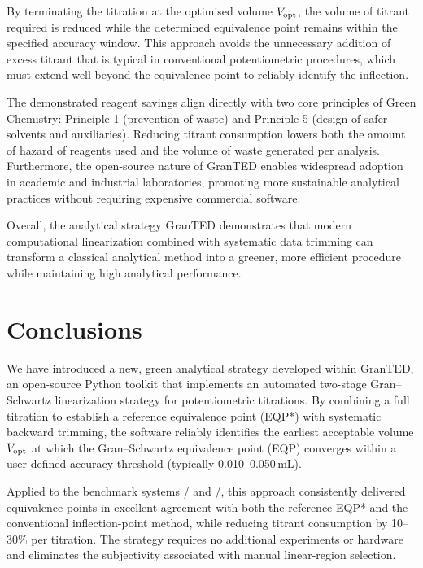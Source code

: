 \documentclass[twoside,twocolumn,9pt]{article}
\begin{document}
By terminating the titration at the optimised volume \(V_{\rm opt}\), the volume of titrant required is reduced while the determined equivalence point remains within the specified accuracy window.
This approach avoids the unnecessary addition of excess titrant that is typical in conventional potentiometric procedures, which must extend well beyond the equivalence point to reliably identify the inflection.

The demonstrated reagent savings align directly with two core principles of Green Chemistry: Principle 1 (prevention of waste) and Principle 5 (design of safer solvents and auxiliaries).
Reducing titrant consumption lowers both the amount of hazard of reagents used and the volume of waste generated per analysis.
Furthermore, the open-source nature of \textsf{GranTED} enables widespread adoption in academic and industrial laboratories, promoting more sustainable analytical practices without requiring expensive commercial software.

Overall, the analytical strategy \textsf{GranTED} demonstrates that modern computational linearization combined with systematic data trimming can transform a classical analytical method into a greener, more efficient procedure while maintaining high analytical performance.

\section*{Conclusions}

We have introduced a new, green analytical strategy developed within \textsf{GranTED}, an open-source Python toolkit that implements an automated two-stage Gran--Schwartz linearization strategy for potentiometric titrations. By combining a full titration to establish a reference equivalence point (EQP*) with systematic backward trimming, the software reliably identifies the earliest acceptable volume \(V_{\rm opt}\) at which the Gran--Schwartz equivalence point (EQP) converges within a user-defined accuracy threshold (typically 0.010--0.050\,mL). 

Applied to the benchmark systems / and /, this approach consistently delivered equivalence points in excellent agreement with both the reference EQP* and the conventional inflection-point method, while reducing titrant consumption by 10--30\% per titration. The strategy requires no additional experiments or hardware and eliminates the subjectivity associated with manual linear-region selection.
\end{document}
